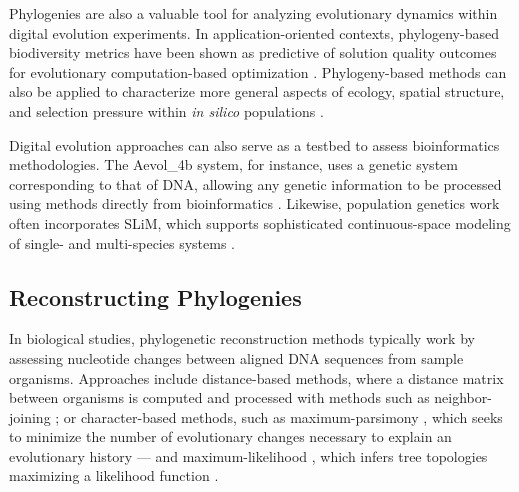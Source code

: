 

Phylogenies are also a valuable tool for analyzing evolutionary dynamics within digital evolution experiments.
In application-oriented contexts, phylogeny-based biodiversity metrics have been shown as predictive of solution quality outcomes for evolutionary computation-based optimization \citep{hernandez2022phylogenetic}.
Phylogeny-based methods can also be applied to characterize more general aspects of ecology, spatial structure, and selection pressure within \textit{in silico} populations \citep{moreno2023toward}.

Digital evolution approaches can also serve as a testbed to assess bioinformatics methodologies.
The Aevol\_4b system, for instance, uses a genetic system corresponding to that of DNA, allowing any genetic information to be processed using methods directly from bioinformatics \citep{daudey2024aevol}.
Likewise, population genetics work often incorporates SLiM, which supports sophisticated continuous-space modeling of single- and multi-species systems \citep{haller2023slim}.

\subsection{Reconstructing Phylogenies} \label{sec:introduction:reconst}

In biological studies, phylogenetic reconstruction methods typically work by assessing nucleotide changes between aligned DNA sequences from sample organisms.
Approaches include distance-based methods, where a distance matrix between organisms is computed and processed with methods such as neighbor-joining \citep{saitou1987neighbor}; or character-based methods, such as maximum-parsimony \citep{sober1991reconstructing}, which seeks to minimize the number of evolutionary changes necessary to explain an evolutionary history --- and maximum-likelihood \citep{felsenstein1981evolutionary}, which infers tree topologies maximizing a likelihood function \citep{de2014phylogenetic}.

